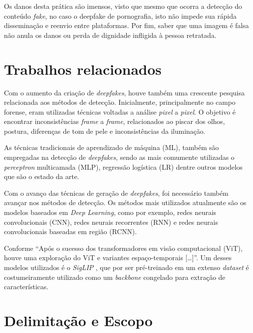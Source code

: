 \documentclass[12pt]{article}
\begin{document}
Os danos desta prática são imensos, visto que mesmo que ocorra a detecção do conteúdo \textit{fake},
no caso o deepfake de pornografia, isto não impede sua rápida disseminação e reenvio entre plataformas.
Por fim, saber que uma imagem é falsa não anula os danos ou perda de dignidade infligida à pessoa retratada.
\cite{mahrSexualizedDeepfakesSociotechnical2026}

\section{Trabalhos relacionados}

Com o aumento da criação de \textit{deepfakes}, houve também uma crescente pesquisa relacionada aos métodos de detecção.
Inicialmente, principalmente no campo forense, eram utilizadas técnicas voltadas a análise \textit{pixel} a \textit{pixel}.
O objetivo é encontrar inconsistências \textit{frame} a \textit{frame}, relacionados ao piscar dos olhos,
postura, diferenças de tom de pele e inconsistências da iluminação. \cite{dagarLiteratureReviewPerspectives2022a}

As técnicas tradicionais de aprendizado de máquina (ML), também são empregadas na detecção de \textit{deepfakes},
sendo as mais comumente utilizadas o \textit{perceptron} multicamada (MLP), regressão logística (LR)
dentre outros modelos que são o estado da arte. \cite{sharmaSystematicLiteratureReview2025}

Com o avanço das técnicas de geração de \textit{deepfakes}, foi necessário também avançar nos métodos de detecção.
Os métodos mais utilizados atualmente são os modelos baseados em \textit{Deep Learning}, como por exemplo,
redes neurais convolucionais (CNN),
redes neurais recorrentes (RNN) e redes neurais convolucionais baseadas em região (RCNN).
\cite{sharmaSystematicLiteratureReview2025,ranaDeepfakeDetectionSystematic2022}

Conforme \textcite{tCombatingDeepfakesTransformer2025}
“Após o sucesso dos transformadores em visão computacional (ViT),
houve uma exploração do ViT e variantes espaço-temporais […]”.
Um desses modelos utilizados é o \textit{SigLIP} , que por ser pré-treinado em um extenso \textit{dataset}
é costumeiramente utilizado como um \textit{backbone} congelado para extração de características.

\section{Delimitação e Escopo}
\end{document}
